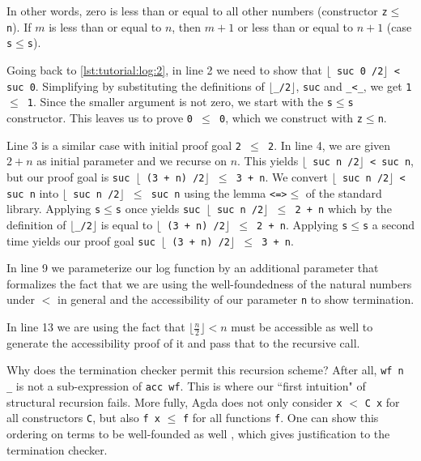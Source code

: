 In other words, zero is less than or equal to all other numbers (constructor \texttt{z$\leq$n}). If $m$ is less than or equal to $n$, then $m + 1$ or less than or equal to $n + 1$ (case \texttt{s$\leq$s}).

Going back to \autoref{lst:tutorial:log:2}, in line 2 we need to show that \texttt{$\lfloor$ suc 0 /2$\rfloor$ < suc 0}. Simplifying by substituting the definitions of \texttt{$\lfloor$\_/2$\rfloor$}, \texttt{suc} and \texttt{\_<\_}, we get \texttt{1 $\leq$ 1}. Since the smaller argument is not zero, we start with the \texttt{s$\leq$s} constructor. This leaves us to prove \texttt{0 $\leq$ 0}, which we construct with \texttt{z$\leq$n}.

Line 3 is a similar case with initial proof goal \texttt{2 $\leq$ 2}. In line 4, we are given $2 + n$ as initial parameter and we recurse on $n$. This yields \texttt{$\lfloor$ suc n /2$\rfloor$ < suc n}, but our proof goal is \texttt{suc $\lfloor$ (3 + n) /2$\rfloor$ $\leq$ 3 + n}. We convert \texttt{$\lfloor$ suc n /2$\rfloor$ < suc n} into \texttt{$\lfloor$ suc n /2$\rfloor$ $\leq$ suc n} using the lemma \texttt{<=>$\leq$} of the standard library. Applying \texttt{s$\leq$s} once yields \texttt{suc $\lfloor$ suc n /2$\rfloor$ $\leq$ 2 + n} which by the definition of \texttt{$\lfloor$\_/2$\rfloor$} is equal to \texttt{$\lfloor$ (3 + n) /2$\rfloor$ $\leq$ 2 + n}. Applying \texttt{s$\leq$s} a second time yields our proof goal \texttt{suc $\lfloor$ (3 + n) /2$\rfloor$ $\leq$ 3 + n}.

In line 9 we parameterize our log function by an additional parameter that formalizes the fact that we are using the well-foundedness of the natural numbers under $<$ in general and the accessibility of our parameter \texttt{n} to show termination.

In line 13 we are using the fact that $\lfloor \frac n 2 \rfloor < n$ must be accessible as well to generate the accessibility proof of it and pass that to the recursive call.

Why does the termination checker permit this recursion scheme? After all, \texttt{wf n \_} is not a sub-expression of \texttt{acc wf}. This is where our ``first intuition" of structural recursion fails. More fully, Agda does not only consider \texttt{x} $<$ \texttt{C x} for all constructors \texttt{C}, but also \texttt{f x} $\leq$ \texttt{f} for all functions \texttt{f}. One can show this ordering on terms to be well-founded as well \cite{abel:2002:predicative-analysis-structural-recursion}, which gives justification to the termination checker.


